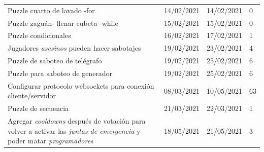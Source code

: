 \begin{longtable}[c]{m{} m{} m{} m{}}
        Puzzle cuarto de lavado -for & 14/02/2021 & 14/02/2021 & 0 \\  
        Puzzle zaguán- llenar cubeta -while & 15/02/2021 & 15/02/2021 & 0 \\ 
        Puzzle condicionales & 16/02/2021 & 17/02/2021 & 1 \\  
        Jugadores \textit{asesinos} pueden hacer sabotajes & 19/02/2021 & 23/02/2021 & 4 \\  
        Puzzle de saboteo de telégrafo & 19/02/2021 & 25/02/2021 & 6 \\  
        Puzzle para saboteo de generador & 19/02/2021 & 25/02/2021 & 6 \\  
        Configurar protocolo websockets para conexión cliente/servidor & 08/03/2021 & 10/05/2021 & 63 \\  
        Puzzle de secuencia & 21/03/2021 & 22/03/2021 & 1 \\  
        Agregar \textit{cooldowns} después de votación para volver a activar las \textit{juntas de emergencia} y poder matar \textit{programadores} & 18/05/2021 & 21/05/2021 & 3 \\  

\end{longtable}

